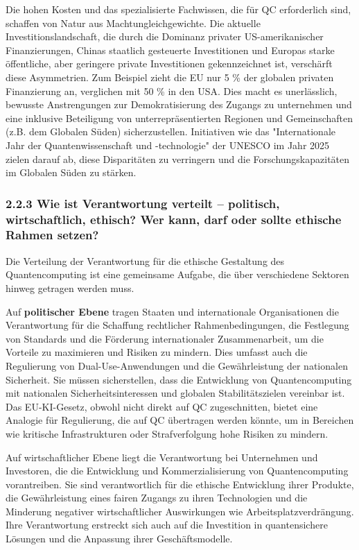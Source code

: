 Die hohen Kosten und das spezialisierte Fachwissen, die für QC erforderlich sind, schaffen von Natur aus Machtungleichgewichte. Die aktuelle Investitionslandschaft, die durch die Dominanz privater US-amerikanischer Finanzierungen, Chinas staatlich gesteuerte Investitionen und Europas starke öffentliche, aber geringere private Investitionen gekennzeichnet ist, verschärft diese Asymmetrien. Zum Beispiel zieht die EU nur 5 \% der globalen privaten Finanzierung an, verglichen mit 50 \% in den USA. Dies macht es unerlässlich, bewusste Anstrengungen zur Demokratisierung des Zugangs zu unternehmen und eine inklusive Beteiligung von unterrepräsentierten Regionen und Gemeinschaften (z.B. dem Globalen Süden) sicherzustellen. Initiativen wie das "Internationale Jahr der Quantenwissenschaft und -technologie" der UNESCO im Jahr 2025 zielen darauf ab, diese Disparitäten zu verringern und die Forschungskapazitäten im Globalen Süden zu stärken.

\subsubsection{2.2.3 Wie ist Verantwortung verteilt – politisch, wirtschaftlich, ethisch? Wer kann, darf oder sollte ethische Rahmen setzen?}
Die Verteilung der Verantwortung für die ethische Gestaltung des Quantencomputing ist eine gemeinsame Aufgabe, die über verschiedene Sektoren hinweg getragen werden muss.

Auf \textbf{politischer Ebene} tragen Staaten und internationale Organisationen die Verantwortung für die Schaffung rechtlicher Rahmenbedingungen, die Festlegung von Standards und die Förderung internationaler Zusammenarbeit, um die Vorteile zu maximieren und Risiken zu mindern. Dies umfasst auch die Regulierung von Dual-Use-Anwendungen und die Gewährleistung der nationalen Sicherheit. Sie müssen sicherstellen, dass die Entwicklung von Quantencomputing mit nationalen Sicherheitsinteressen und globalen Stabilitätszielen vereinbar ist. Das EU-KI-Gesetz, obwohl nicht direkt auf QC zugeschnitten, bietet eine Analogie für Regulierung, die auf QC übertragen werden könnte, um in Bereichen wie kritische Infrastrukturen oder Strafverfolgung hohe Risiken zu mindern.


Auf wirtschaftlicher Ebene liegt die Verantwortung bei  Unternehmen und Investoren, die die Entwicklung und Kommerzialisierung von Quantencomputing vorantreiben. Sie sind verantwortlich für die ethische Entwicklung ihrer Produkte, die Gewährleistung eines fairen Zugangs zu ihren Technologien und die Minderung negativer wirtschaftlicher Auswirkungen wie Arbeitsplatzverdrängung. Ihre Verantwortung erstreckt sich auch auf die Investition in quantensichere Lösungen und die Anpassung ihrer Geschäftsmodelle.

